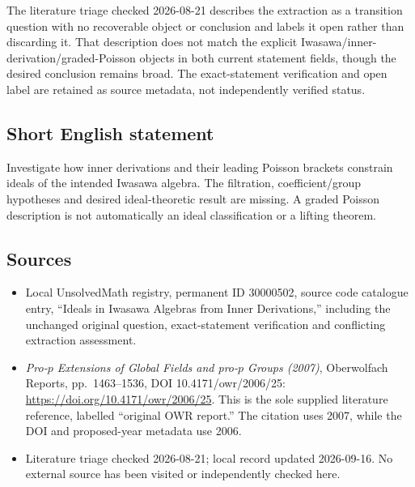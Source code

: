 \documentclass[11pt]{article}
\begin{document}
The literature triage checked 2026-08-21 describes the extraction as a transition question with no recoverable object or conclusion and labels it open rather than discarding it. That description does not match the explicit Iwasawa/inner-derivation/graded-Poisson objects in both current statement fields, though the desired conclusion remains broad. The exact-statement verification and open label are retained as source metadata, not independently verified status.
\subsection{Short English statement}
Investigate how inner derivations and their leading Poisson brackets constrain ideals of the intended Iwasawa algebra. The filtration, coefficient/group hypotheses and desired ideal-theoretic result are missing. A graded Poisson description is not automatically an ideal classification or a lifting theorem.
\subsection{Sources}
\begin{itemize}
\item Local UnsolvedMath registry, permanent ID 30000502, source code catalogue entry, ``Ideals in Iwasawa Algebras from Inner Derivations,'' including the unchanged original question, exact-statement verification and conflicting extraction assessment.
\item \emph{Pro-\(p\) Extensions of Global Fields and pro-\(p\) Groups (2007)}, Oberwolfach Reports, pp.\ 1463--1536, DOI 10.4171/owr/2006/25: \url{https://doi.org/10.4171/owr/2006/25}. This is the sole supplied literature reference, labelled ``original OWR report.'' The citation uses 2007, while the DOI and proposed-year metadata use 2006.
\item Literature triage checked 2026-08-21; local record updated 2026-09-16. No external source has been visited or independently checked here.
\end{itemize}
\end{document}
